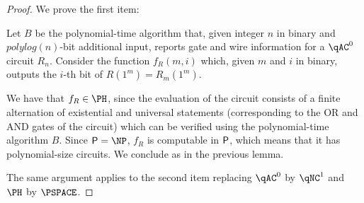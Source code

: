 \begin{proof}
	We prove the first item:

	Let $B$ be the polynomial-time algorithm that, given integer $n$
	in binary and $polylog(n)$-bit additional input, reports gate and wire information
	for a $\qAC^0$ circuit $R_n$. Consider the function $f_R(m, i)$ which, 
	given $m$ and $i$ in binary, outputs the $i$-th bit of $R(1^m) = R_m(1^m)$.

	We have that $f_R \in \PH$, since the evaluation of the circuit consists 
	of a finite alternation of existential and universal statements (corresponding to the 
	OR and AND gates of the circuit) which can be verified using the polynomial-time
	algorithm $B$. Since $\PTIME = \NP$, $f_R$ is computable in $\mathsf{P}$, which means that it has 
	polynomial-size circuits. We conclude as in the previous lemma. 

	The same argument applies to the second item replacing $\qAC^0$ by $\qNC^1$ and $\PH$ by $\PSPACE$. 
\end{proof}

